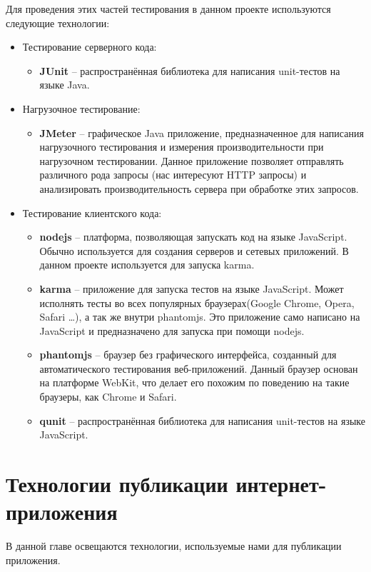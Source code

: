 	Для проведения этих частей тестирования в данном проекте используются следующие технологии:
	\begin{itemize}
\item Тестирование серверного кода:
	\begin{itemize}
		\item \textbf{JUnit} -- распространённая библиотека для написания unit-тестов на языке Java.
	\end{itemize}
\item Нагрузочное тестирование:
	\begin{itemize}
		\item \textbf{JMeter} -- графическое Java приложение, предназначенное для написания нагрузочного тестирования и измерения производительности при нагрузочном тестировании. Данное приложение позволяет отправлять различного рода запросы (нас интересуют HTTP запросы) и анализировать производительность сервера при обработке этих запросов.
	\end{itemize}
\item Тестирование клиентского кода:
\begin{itemize}
	\item \textbf{nodejs} -- платформа, позволяющая запускать код на языке JavaScript. Обычно используется для создания серверов и сетевых приложений. В данном проекте используется для запуска karma.
	\item \textbf{karma} -- приложение для запуска тестов на языке JavaScript. Может исполнять тесты во всех популярных браузерах(Google Chrome, Opera, Safari \dots), а так же внутри phantomjs. Это приложение само написано на JavaScript и предназначено для запуска при помощи nodejs.
	\item \textbf{phantomjs} -- браузер без графического интерфейса, созданный для автоматического тестирования веб-приложений. Данный браузер основан на платформе WebKit, что делает его похожим по поведению на такие браузеры, как Chrome и Safari.
	\item \textbf{qunit} -- распространённая библиотека для написания unit-тестов на языке JavaScript.
\end{itemize}
\end{itemize}

\section{Технологии публикации интернет-приложения}
В данной главе освещаются технологии, используемые нами для публикации приложения.
